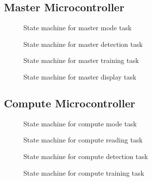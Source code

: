 \documentclass{article}
\begin{document}
\subsection{Master Microcontroller}
\label{app.sm.master}

\begin{figure}[H]
  \centering
  \caption{State machine for master mode task}
  
  \label{sm:1}
\end{figure}

\begin{figure}[H]
  \centering
  \caption{State machine for master detection task}
  
  \label{sm:2}
\end{figure}

\begin{figure}[H]
  \centering
  \caption{State machine for master training task}
  
  \label{sm:3}
\end{figure}

\begin{figure}[H]
  \centering
  \caption{State machine for master display task}
  
  \label{sm:4}
\end{figure}

\subsection{Compute Microcontroller}
\label{app.sm.compute}

\begin{figure}[H]
  \caption{State machine for compute mode task}
  
  \label{sm:5}
\end{figure}

\begin{figure}[H]
  \caption{State machine for compute reading task}
  
  \label{sm:6}
\end{figure}

\begin{figure}[H]
  \caption{State machine for compute detection task}
  
  \label{sm:7}
\end{figure}

\begin{figure}[H]
  \caption{State machine for compute training task}
  
  \label{sm:8}
\end{figure}
\end{document}
